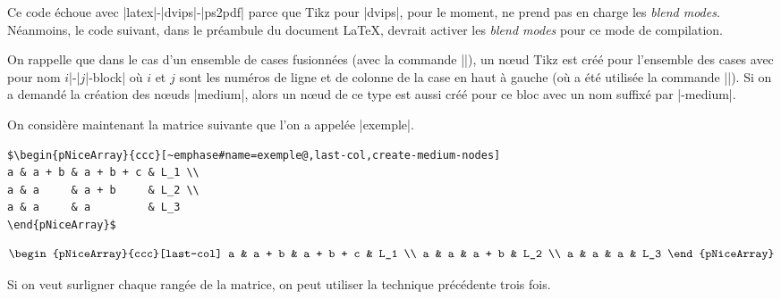 \documentclass[dvipsnames]{article}%
\begin{document}
\bigskip
Ce code échoue avec |latex|-|dvips|-|ps2pdf| parce que Tikz pour |dvips|, pour
le moment, ne prend pas en charge les \emph{blend modes}. Néanmoins, le code
suivant, dans le préambule du document LaTeX, devrait activer les \emph{blend
  modes} pour ce mode de compilation.



\vspace{1cm} On rappelle que dans le cas d'un ensemble de cases fusionnées (avec
la commande |\Block|), un nœud Tikz est créé pour l'ensemble des cases avec pour
nom $i$|-|$j$|-block| où $i$ et $j$ sont les numéros de ligne et de colonne de
la case en haut à gauche (où a été utilisée la commande |\Block|). Si on a
demandé la création des nœuds |medium|, alors un nœud de ce type est aussi créé
pour ce bloc avec un nom suffixé par |-medium|.



\vspace{1cm}
On considère maintenant la matrice suivante que l'on a appelée |exemple|.

\medskip
\begin{Verbatim}
$\begin{pNiceArray}{ccc}[~emphase#name=exemple@,last-col,create-medium-nodes]
a & a + b & a + b + c & L_1 \\
a & a     & a + b     & L_2 \\
a & a     & a         & L_3
\end{pNiceArray}$
\end{Verbatim}
                          
\[\begin{pNiceArray}{ccc}[last-col]
a & a + b & a + b + c & L_1 \\
a & a     & a + b     & L_2 \\
a & a     & a         & L_3
\end{pNiceArray}\]

\bigskip
Si on veut surligner chaque rangée de la matrice, on peut utiliser la technique précédente trois fois.
\end{document}
